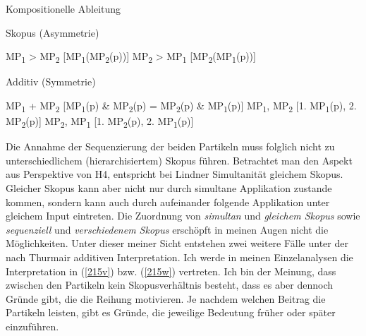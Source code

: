 \begin{exe}
	\ex\label{215hh} 
	Kompositionelle Ableitung
		\begin{xlist}	
			\ex\label{215a} Skopus (Asymmetrie)
				\begin{xlist}
						\ex\label{215s} MP\textsubscript{1} > MP\textsubscript{2}  [MP\textsubscript{1}(MP\textsubscript{2}(\textrm{p}))]
						\ex\label{215t} MP\textsubscript{2} > MP\textsubscript{1}  [MP\textsubscript{2}(MP\textsubscript{1}(\textrm{p}))]
				\end{xlist}			
			\ex\label{215b} Additiv (Symmetrie)
				\begin{xlist} 		
						\ex\label{215u} MP\textsubscript{1} + MP\textsubscript{2}  [MP\textsubscript{1}(\textrm{p}) \& MP\textsubscript{2}(\textrm{p}) = MP\textsubscript{2}(\textrm{p}) \&  MP\textsubscript{1}(\textrm{p})]
						\ex\label{215v} MP\textsubscript{1}, MP\textsubscript{2}  [1. MP\textsubscript{1}(\textrm{p}), 2. MP\textsubscript{2}(\textrm{p})]
						\ex\label{215w} MP\textsubscript{2}, MP\textsubscript{1}  [1. MP\textsubscript{2}(\textrm{p}), 2. MP\textsubscript{1}(\textrm{p})]
				\end{xlist}
		\end{xlist}	
\end{exe}
Die Annahme der Sequenzierung der beiden Partikeln muss folglich nicht zu unterschiedlichem (hierarchisiertem) Skopus  führen. Betrachtet man den Aspekt aus Perspektive von H4, entspricht bei Lindner Simultanität gleichem Skopus. Gleicher Skopus kann aber nicht nur durch simultane Applikation zustande kommen, sondern kann auch durch aufeinander folgende Applikation unter gleichem Input eintreten. Die Zuordnung von \textit{simultan} und \textit{gleichem Skopus} sowie \textit{sequenziell} und \textit{verschiedenem Skopus} erschöpft in meinen Augen nicht die Möglichkei\-ten. Unter dieser meiner Sicht entstehen zwei weitere Fälle unter der nach Thurmair additiven Interpretation. Ich werde in meinen Einzelanalysen die Interpretation in (\ref{215v}) bzw. (\ref{215w}) vertreten. Ich bin der Meinung, dass zwischen den Partikeln kein Skopusverhältnis besteht, dass es aber dennoch Gründe gibt, die die Reihung motivieren. Je nachdem welchen Beitrag die Partikeln leisten, gibt es Gründe, die jeweilige Bedeutung früher oder später einzuführen.\largerpage[-2]

